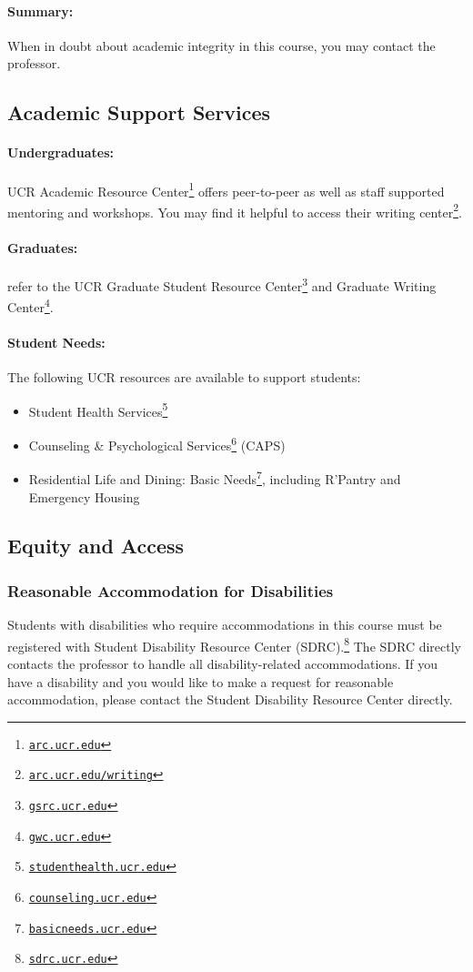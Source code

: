 \documentclass[12pt]{article}
\newcommand{\footlink}[1]{\footnote{\href{https://#1}{\texttt{#1}}}}
\newcommand{\UCR}{\acro{UCR}\xspace}
\newcommand\acro[1]{{\small {#1}}}
\numberwithin{equation}{section}    %
\begin{document}
\paragraph{Summary:} When in doubt about academic integrity in this course, you may contact the professor.


\subsection{Academic Support Services}


\paragraph{Undergraduates:} \UCR Academic Resource Center\footlink{arc.ucr.edu} offers peer-to-peer as well as staff supported mentoring and workshops. You may find it helpful to access their writing center\footlink{arc.ucr.edu/writing}. 

\paragraph{Graduates:} refer to the \UCR Graduate Student Resource Center\footlink{gsrc.ucr.edu} and Graduate Writing Center\footlink{gwc.ucr.edu}.

\paragraph{Student Needs:} The following \UCR resources are available to support students:
\begin{itemize}
	\item Student Health Services\footlink{studenthealth.ucr.edu}
	\item Counseling \& Psychological Services\footlink{counseling.ucr.edu} (\acro{CAPS})
	\item Residential Life and Dining: Basic Needs\footlink{basicneeds.ucr.edu}, including R’Pantry and Emergency Housing
\end{itemize}



\subsection{Equity and Access}

\subsubsection{Reasonable Accommodation for Disabilities}
Students with disabilities who require accommodations in this course must be registered with Student Disability Resource Center (\acro{SDRC}).\footlink{sdrc.ucr.edu} The \acro{SDRC} directly contacts the professor to handle all disability-related accommodations.
%
If you have a disability and you would like to make a request for reasonable accommodation, please contact the Student Disability Resource Center directly.
\end{document}
